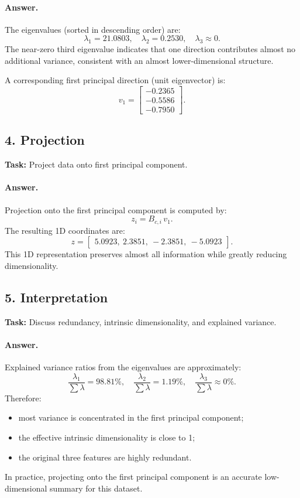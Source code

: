 \paragraph{Answer.}
The eigenvalues (sorted in descending order) are:
\[
\lambda_1=21.0803,\quad
\lambda_2=0.2530,\quad
\lambda_3\approx 0.
\]
The near-zero third eigenvalue indicates that one direction contributes almost no additional variance, consistent with an almost lower-dimensional structure.

A corresponding first principal direction (unit eigenvector) is:
\[
v_1=
\begin{bmatrix}
-0.2365\\
-0.5586\\
-0.7950
\end{bmatrix}.
\]

\subsection{4. Projection}
\textbf{Task:} Project data onto first principal component.

\paragraph{Answer.}
Projection onto the first principal component is computed by:
\[
z_i = B_{c,i}\,v_1.
\]
The resulting 1D coordinates are:
\[
z=
\begin{bmatrix}
5.0923,\ 2.3851,\ -2.3851,\ -5.0923
\end{bmatrix}.
\]
This 1D representation preserves almost all information while greatly reducing dimensionality.

\subsection{5. Interpretation}
\textbf{Task:} Discuss redundancy, intrinsic dimensionality, and explained variance.

\paragraph{Answer.}
Explained variance ratios from the eigenvalues are approximately:
\[
\frac{\lambda_1}{\sum\lambda}=98.81\%,\quad
\frac{\lambda_2}{\sum\lambda}=1.19\%,\quad
\frac{\lambda_3}{\sum\lambda}\approx 0\%.
\]
Therefore:
\begin{itemize}
  \item most variance is concentrated in the first principal component;
  \item the effective intrinsic dimensionality is close to 1;
  \item the original three features are highly redundant.
\end{itemize}
In practice, projecting onto the first principal component is an accurate low-dimensional summary for this dataset.
